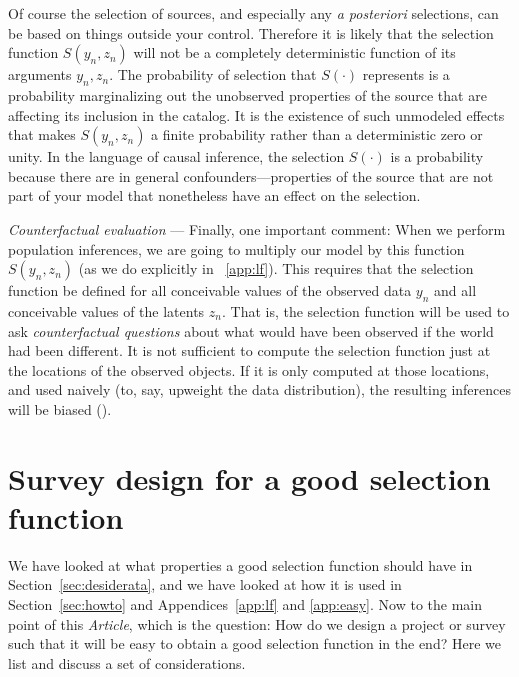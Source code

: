 \documentclass[modern]{aastex62}
\newcommand{\documentname}{\textsl{Article}}
\newcommand{\sectionname}{Section}
\newcommand{\appendixnames}{Appendices}
\newcommand{\foreign}[1]{\textsl{#1}}
\renewcommand{\paragraph}[1]{\medskip\noindent\textit{#1} ---}
\begin{document}
Of course the selection of sources, and especially any \foreign{a
  posteriori} selections, can be based on things outside your control.
Therefore it is likely that the selection function $S(y_n, z_n)$ will
not be a completely deterministic function of its arguments $y_n, z_n$.
The probability of selection that $S(\cdot)$ represents is a
probability marginalizing out the unobserved properties of the source
that are affecting its inclusion in the catalog.
It is the existence of such unmodeled effects that makes $S(y_n, z_n)$
a finite probability rather than a deterministic zero or unity.
In the language of causal inference, the selection $S(\cdot)$ is a
probability because there are in general confounders---properties of
the source that are not part of your model that nonetheless have an
effect on the selection.

\paragraph{Counterfactual evaluation}
Finally, one important comment: When we perform population inferences,
we are going to multiply our model by this function $S(y_n, z_n)$ (as
we do explicitly in \appendixname~\ref{app:lf}).
This requires that the selection function be defined for all
conceivable values of the observed data $y_n$ and all conceivable
values of the latents $z_n$.
That is, the selection function will be used to ask
\emph{counterfactual questions} about what would have been observed if
the world had been different.
It is not sufficient to compute the selection function just at the
locations of the observed objects.
If it is only computed at those locations, and used naively (to, say,
upweight the data distribution), the resulting inferences will be 
biased (\citealt{blogpost}).

\section{Survey design for a good selection function}\label{sec:design}

We have looked at what properties a good selection function should
have in \sectionname~\ref{sec:desiderata}, and we have looked at how
it is used in \sectionname~\ref{sec:howto}
and \appendixnames~\ref{app:lf} and \ref{app:easy}.
Now to the main point of this \documentname, which is the question:
How do we design a project or survey such that it will be easy
to obtain a good selection function in the end?
Here we list and discuss a set of considerations.
\end{document}
